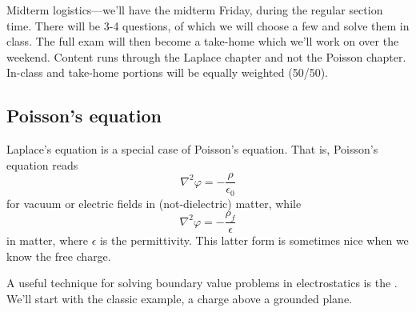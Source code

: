 Midterm logistics---we'll have the midterm Friday, during the regular section time. There will be 3-4 questions, of which we will choose a few and solve them in class. The full exam will then become a take-home which we'll work on over the weekend. Content runs through the Laplace chapter and not the Poisson chapter. In-class and take-home portions will be equally weighted (50/50).

\subsection*{Poisson's equation}
Laplace's equation is a special case of Poisson's equation. That is, Poisson's equation reads
\begin{equation}
    \nabla^2 \varphi = -\frac{\rho}{\epsilon_0}
\end{equation}
for vacuum or electric fields in (not-dielectric) matter, while
\begin{equation}
    \nabla^2 \varphi = -\frac{\rho_f}{\epsilon}
\end{equation}
in matter, where $\epsilon$ is the permittivity. This latter form is sometimes nice when we know the free charge.

A useful technique for solving boundary value problems in electrostatics is the . We'll start with the classic example, a charge above a grounded plane.

